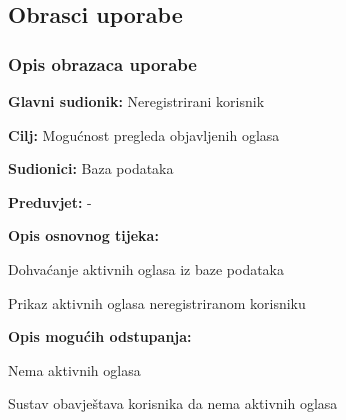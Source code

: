 			\eject 
			
			
				
			\subsection{Obrasci uporabe}
				
				\subsubsection{Opis obrazaca uporabe}

					\noindent {}
					\begin{packed_item}
	
						\item \textbf{Glavni sudionik: }Neregistrirani korisnik
						\item  \textbf{Cilj:} Mogućnost pregleda objavljenih oglasa
						\item  \textbf{Sudionici:} Baza podataka
						\item  \textbf{Preduvjet:} -
						\item  \textbf{Opis osnovnog tijeka:}
						
						\item[] \begin{packed_enum}
							\item Dohvaćanje aktivnih oglasa iz baze podataka
							\item Prikaz aktivnih oglasa neregistriranom korisniku
						\end{packed_enum}
						
						\item  \textbf{Opis mogućih odstupanja:}
						
						\item[] \begin{packed_item}
	
							\item[1.a] Nema aktivnih oglasa
							\item[] \begin{packed_enum}
								\item Sustav obavještava korisnika da nema aktivnih oglasa
							\end{packed_enum}
							
						\end{packed_item}
					\end{packed_item}
				

